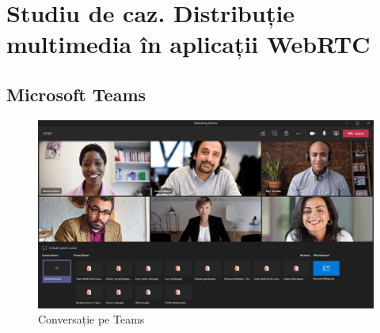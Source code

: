 \chapter{Studiu de caz. Distribuție multimedia în aplicații WebRTC}
\label{chap:ch4}

\section{Microsoft Teams}
\label{chap:ch4sec1}
\begin{figure}[!htbp]
    \centering
    \includegraphics[width=12cm]{figures/ms_teams_call.png}
    \caption{Conversație pe Teams}
\end{figure}

